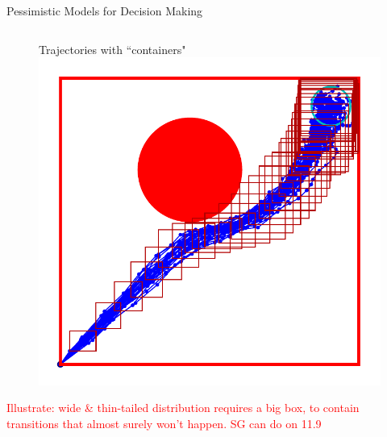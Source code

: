\documentclass[lecture]{beamer}
\begin{document}
\begin{frame}{\normalsize Pessimistic Models for Decision Making}
\begin{columns}[t]
\begin{overlayarea}{\textwidth}{1\textheight}
\begin{figure}
{        }%
        {%
                \center
        Trajectories with ``containers"
   \includegraphics[width=\FS\textwidth]{Codes/BasicsSafety/PessimisticModel40.pdf}%
        }%
    \end{figure}
    \textcolor{red}{Illustrate: wide \& thin-tailed distribution requires a big box, to contain transitions that almost surely won't happen. SG can do on 11.9}
  \end{overlayarea} 



\end{columns}

  




\end{frame}

\end{document}
